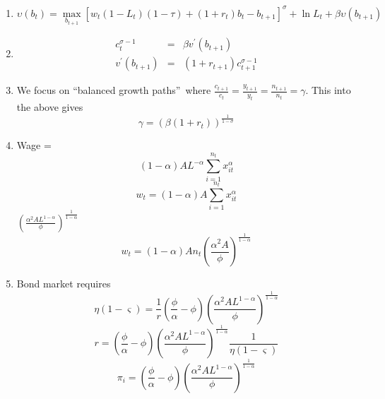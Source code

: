 \documentclass[11pt]{article}
\begin{document}
\begin{enumerate}
\item 
\begin{equation*}
\upsilon \left( b_{t}\right) =\underset{b_{t+1}}{\max }\left[ w_{t}\left(
1-L_{t}\right) \left( 1-\tau \right) +\left( 1+r_{t}\right) b_{t}-b_{t+1}%
\right] ^{\sigma }+\ln L_{t}+\beta \upsilon \left( b_{t+1}\right) 
\end{equation*}

\item 
\begin{eqnarray*}
c_{t}^{\sigma -1} &=&\beta v^{\prime }(b_{t+1}) \\
v^{\prime }(b_{t+1}) &=&\left( 1+r_{t+1}\right) c_{t+1}^{\sigma -1}
\end{eqnarray*}

\item We focus on \textquotedblleft balanced growth paths\textquotedblright\
where $\frac{c_{t+1}}{c_{t}}=\frac{y_{t+1}}{y_{t}}=\frac{n_{t+1}}{n_{t}}%
=\gamma $. This into the above gives 
\begin{equation*}
\gamma =\left( \beta \left( 1+r_{t}\right) \right) ^{\frac{1}{1-\sigma }}
\end{equation*}

\item Wage =%
\begin{equation*}
\left( 1-\alpha \right) AL^{-\alpha }\overset{n_{t}}{\underset{i=1}{\sum }}%
x_{it}^{\alpha }
\end{equation*}%
\begin{equation*}
w_{t}=\left( 1-\alpha \right) A\overset{n_{t}}{\underset{i=1}{\sum }}%
x_{it}^{\alpha }
\end{equation*}%
$\left( \frac{\alpha ^{2}AL^{1-\alpha }}{\phi }\right) ^{\frac{1}{1-\alpha }%
} $%
\begin{equation*}
w_{t}=\left( 1-\alpha \right) An_{t}\left( \frac{\alpha ^{2}A}{\phi }\right)
^{\frac{1}{1-\alpha }}
\end{equation*}

\item Bond market requires%
\begin{equation*}
\eta \left( 1-\varsigma \right) =\frac{1}{r}\left( \frac{\phi }{\alpha }%
-\phi \right) \left( \frac{\alpha ^{2}AL^{1-\alpha }}{\phi }\right) ^{\frac{1%
}{1-\alpha }}
\end{equation*}%
\begin{equation*}
r=\left( \frac{\phi }{\alpha }-\phi \right) \left( \frac{\alpha
^{2}AL^{1-\alpha }}{\phi }\right) ^{\frac{1}{1-\alpha }}\frac{1}{\eta \left(
1-\varsigma \right) }
\end{equation*}%
\begin{equation*}
\pi _{i}=\left( \frac{\phi }{\alpha }-\phi \right) \left( \frac{\alpha
^{2}AL^{1-\alpha }}{\phi }\right) ^{\frac{1}{1-\alpha }}
\end{equation*}


\end{enumerate}
\end{document}
